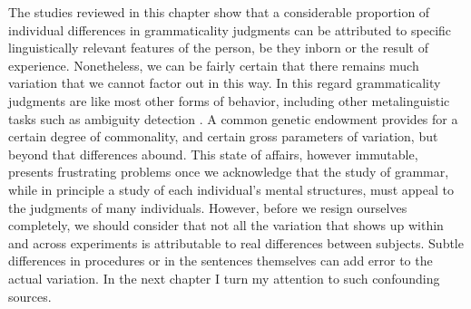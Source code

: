 The studies reviewed in this chapter show that a considerable proportion of individual differences in grammaticality judgments can be attributed to specific linguistically relevant features of the person, be they inborn or the result of experience. Nonetheless, we can be fairly certain that there remains much variation that we cannot factor out in this way. In this regard grammaticality judgments are like most other forms of behavior, including other metalinguistic tasks such as ambiguity detection \citep{KessEtAl1983}. A common genetic endowment provides for a certain degree of commonality, and certain gross parameters of variation, but beyond  that differences abound. This state of affairs, however immutable, presents frustrating problems once we acknowledge that the study of grammar, while in principle a study of each individual's mental structures, must appeal to the judgments of many individuals. However, before we resign ourselves completely, we should consider that not all the variation that shows up within and across experiments is attributable to real differences between subjects. Subtle differences in procedures or in the sentences themselves can add error to the actual variation. In the next chapter I turn my attention to such confounding sources.
